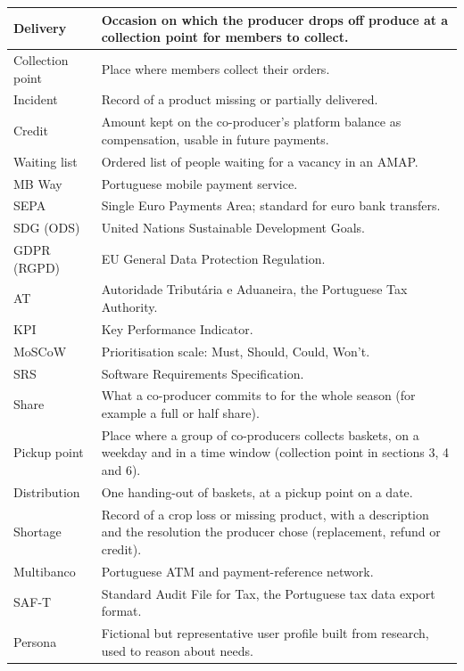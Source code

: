 \documentclass[11pt,a4paper]{article}
\begin{document}
{\begin{longtable}{>{\raggedright\arraybackslash\hspace{0pt}}p{}>{\raggedright\arraybackslash\hspace{0pt}}p{}}
Delivery & Occasion on which the producer drops off produce at a collection point for members to collect. \\ \hline
Collection point & Place where members collect their orders. \\ \hline
Incident & Record of a product missing or partially delivered. \\ \hline
Credit & Amount kept on the co-producer's platform balance as compensation, usable in future payments. \\ \hline
Waiting list & Ordered list of people waiting for a vacancy in an AMAP. \\ \hline
MB Way & Portuguese mobile payment service. \\ \hline
SEPA & Single Euro Payments Area; standard for euro bank transfers. \\ \hline
SDG (ODS) & United Nations Sustainable Development Goals. \\ \hline
GDPR (RGPD) & EU General Data Protection Regulation. \\ \hline
AT & Autoridade Tributária e Aduaneira, the Portuguese Tax Authority. \\ \hline
KPI & Key Performance Indicator. \\ \hline
MoSCoW & Prioritisation scale: Must, Should, Could, Won't. \\ \hline
SRS & Software Requirements Specification. \\ \hline
Share & What a co-producer commits to for the whole season (for example a full or half share). \\ \hline
Pickup point & Place where a group of co-producers collects baskets, on a weekday and in a time window (collection point in sections 3, 4 and 6). \\ \hline
Distribution & One handing-out of baskets, at a pickup point on a date. \\ \hline
Shortage & Record of a crop loss or missing product, with a description and the resolution the producer chose (replacement, refund or credit). \\ \hline
Multibanco & Portuguese ATM and payment-reference network. \\ \hline
SAF-T & Standard Audit File for Tax, the Portuguese tax data export format. \\ \hline
Persona & Fictional but representative user profile built from research, used to reason about needs. \\ \hline
\end{longtable}}
\end{document}
